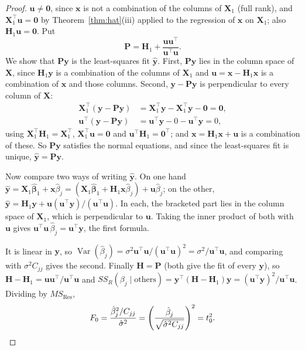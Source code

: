 \documentclass[11pt,a4paper]{article}
\numberwithin{equation}{section}
\theoremstyle{definition}
\begin{document}
\begin{proof}
$\mathbf{u} \neq \mathbf{0}$, since $\mathbf{x}$ is not a combination of the columns of
$\mathbf{X}_1$ (full rank), and $\mathbf{X}_1^\top\mathbf{u} = \mathbf{0}$ by
Theorem~\ref{thm:hat}(iii) applied to the regression of $\mathbf{x}$ on $\mathbf{X}_1$; also
$\mathbf{H}_1\mathbf{u} = \mathbf{0}$. Put
\[
\mathbf{P} = \mathbf{H}_1 + \frac{\mathbf{u}\mathbf{u}^\top}{\mathbf{u}^\top\mathbf{u}} .
\]
We show that $\mathbf{Py}$ is the least-squares fit $\hat{\mathbf{y}}$. First, $\mathbf{Py}$
lies in the column space of $\mathbf{X}$, since $\mathbf{H}_1\mathbf{y}$ is a combination of
the columns of $\mathbf{X}_1$ and $\mathbf{u} = \mathbf{x} - \mathbf{H}_1\mathbf{x}$ is a
combination of $\mathbf{x}$ and those columns. Second, $\mathbf{y} - \mathbf{Py}$ is
perpendicular to every column of $\mathbf{X}$:
\begin{align*}
\mathbf{X}_1^\top(\mathbf{y} - \mathbf{Py}) &= \mathbf{X}_1^\top\mathbf{y} - \mathbf{X}_1^\top\mathbf{y} - \mathbf{0} = \mathbf{0}, \\
\mathbf{u}^\top(\mathbf{y} - \mathbf{Py}) &= \mathbf{u}^\top\mathbf{y} - 0 - \mathbf{u}^\top\mathbf{y} = 0 ,
\end{align*}
using $\mathbf{X}_1^\top\mathbf{H}_1 = \mathbf{X}_1^\top$, $\mathbf{X}_1^\top\mathbf{u} = \mathbf{0}$
and $\mathbf{u}^\top\mathbf{H}_1 = \mathbf{0}^\top$; and $\mathbf{x} = \mathbf{H}_1\mathbf{x} + \mathbf{u}$
is a combination of these. So $\mathbf{Py}$ satisfies the normal equations, and since the
least-squares fit is unique, $\hat{\mathbf{y}} = \mathbf{Py}$.

Now compare two ways of writing $\hat{\mathbf{y}}$. On one hand
$\hat{\mathbf{y}} = \mathbf{X}_1\hat{\boldsymbol\beta}_1 + \mathbf{x}\hat\beta_j
= (\mathbf{X}_1\hat{\boldsymbol\beta}_1 + \mathbf{H}_1\mathbf{x}\hat\beta_j) + \mathbf{u}\hat\beta_j$;
on the other, $\hat{\mathbf{y}} = \mathbf{H}_1\mathbf{y} + \mathbf{u}(\mathbf{u}^\top\mathbf{y})/(\mathbf{u}^\top\mathbf{u})$.
In each, the bracketed part lies in the column space of $\mathbf{X}_1$, which is perpendicular to
$\mathbf{u}$. Taking the inner product of both with $\mathbf{u}$ gives
$\mathbf{u}^\top\mathbf{u}\,\hat\beta_j = \mathbf{u}^\top\mathbf{y}$, the first formula.

It is linear in $\mathbf{y}$, so
$\operatorname{Var}(\hat\beta_j) = \sigma^2\mathbf{u}^\top\mathbf{u}/(\mathbf{u}^\top\mathbf{u})^2 = \sigma^2/\mathbf{u}^\top\mathbf{u}$,
and comparing with $\sigma^2 C_{jj}$ gives the second. Finally
$\mathbf{H} = \mathbf{P}$ (both give the fit of every $\mathbf{y}$), so
$\mathbf{H} - \mathbf{H}_1 = \mathbf{u}\mathbf{u}^\top/\mathbf{u}^\top\mathbf{u}$ and
$SS_R(\beta_j \mid \text{others}) = \mathbf{y}^\top(\mathbf{H} - \mathbf{H}_1)\mathbf{y} = (\mathbf{u}^\top\mathbf{y})^2/\mathbf{u}^\top\mathbf{u}$.
Dividing by $MS_{\mathrm{Res}}$,
\[
F_0 = \frac{\hat\beta_j^2/C_{jj}}{\hat\sigma^2} = \left( \frac{\hat\beta_j}{\sqrt{\hat\sigma^2 C_{jj}}} \right)^2 = t_0^2 . \qedhere
\]
\end{proof}
\end{document}
